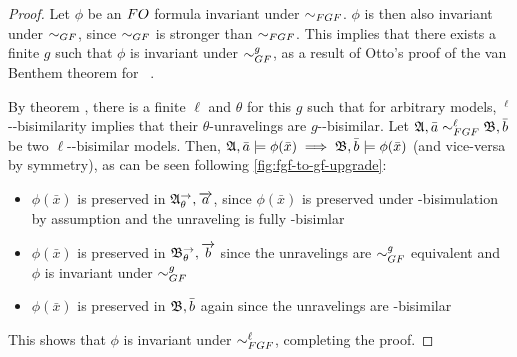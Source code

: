 \begin{proof}
  Let $\phi$ be an $\FO$ formula invariant under $\bisimto_{\FGF}$.
  $\phi$ is then also invariant under $\bisimto_{\GF}$, since $\bisimto_{\GF}$ is stronger than $\bisimto_{\FGF}$.
  This implies that there exists a finite $g$ such that $\phi$ is invariant under $\bisimto_{\GF}^{g}$, as a result of Otto's proof of the van Benthem theorem for \GF~\cite{Otto2012}.

  By theorem , there is a finite $\ell$ and $\theta$ for this $g$ such that for arbitrary models, $~^{\ell}$-\FGF-bisimilarity implies that their $\theta$-unravelings are $g$-\GF-bisimilar.
  Let $\str{A}, \bar{a} \bisimto_{\FGF}^{\ell} \str{B}, \bar{b}$ be two $\ell$-\FGF-bisimilar models.
  Then, ${\mathfrak{A}}, \bar{a} \models \phi(\bar{x}) \implies {\mathfrak{B}}, \bar{b} \models \phi(\bar{x})$ (and vice-versa by symmetry), as can be seen following \cref{fig:fgf-to-gf-upgrade}:
  \begin{itemize}
    \item $\phi(\bar{x})$ is preserved in ${\mathfrak{A}}^{\rightarrow}_{\theta}, \overrightarrow{a}$, since $\phi(\bar{x})$ is preserved under \FGF-bisimulation by assumption and the unraveling is fully \FGF-bisimlar
    \item $\phi(\bar{x})$ is preserved in ${\mathfrak{B}}^{\rightarrow}_{\theta}, \overrightarrow{b}$ since the unravelings are $\bisimto_{\GF}^{g}$ equivalent and $\phi$ is invariant under $\bisimto_{\GF}^{g}$
    \item $\phi(\bar{x})$ is preserved in ${\mathfrak{B}}, \bar{b}$ again since the unravelings are \FGF-bisimilar
  \end{itemize}
  This shows that $\phi$ is invariant under $\bisimto_{\FGF}^{\ell}$, completing the proof.
\end{proof}

